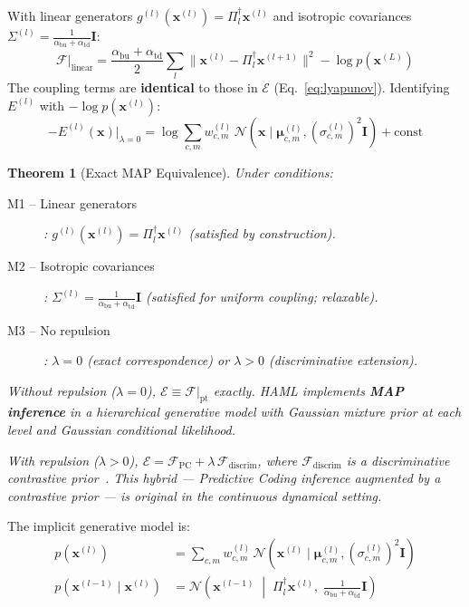 \documentclass[11pt,a4paper]{article}
\newtheorem{theorem}{Theorem}[section]
\begin{document}
With linear generators $g^{(l)}(\mathbf{x}^{(l)}) = \Pi_l^\dagger \mathbf{x}^{(l)}$ and
isotropic covariances $\Sigma^{(l)} = \frac{1}{\alpha_{\mathrm{bu}}+\alpha_{\mathrm{td}}}\mathbf{I}$:
\begin{equation}
  \mathcal{F}\big|_{\mathrm{linear}} =
    \frac{\alpha_{\mathrm{bu}}+\alpha_{\mathrm{td}}}{2}
    \sum_l \|\mathbf{x}^{(l)} - \Pi_l^\dagger \mathbf{x}^{(l+1)}\|^2
    - \log p(\mathbf{x}^{(L)})
\end{equation}
The coupling terms are \textbf{identical} to those in $\mathcal{E}$ (Eq.~\ref{eq:lyapunov}).
Identifying $E^{(l)}$ with $-\log p(\mathbf{x}^{(l)})$:
\begin{equation}
  -E^{(l)}(\mathbf{x})\big|_{\lambda=0} =
    \log \sum_{c,m} w^{(l)}_{c,m}\,
    \mathcal{N}(\mathbf{x} \mid \boldsymbol{\mu}^{(l)}_{c,m}, (\sigma^{(l)}_{c,m})^2\mathbf{I})
    + \text{const}
\end{equation}

\begin{theorem}[Exact MAP Equivalence]
Under conditions:
\begin{description}
  \item[M1 -- Linear generators]: $g^{(l)}(\mathbf{x}^{(l)}) = \Pi_l^\dagger \mathbf{x}^{(l)}$
        (satisfied by construction).
  \item[M2 -- Isotropic covariances]: $\Sigma^{(l)} = \frac{1}{\alpha_{\mathrm{bu}}+\alpha_{\mathrm{td}}}\mathbf{I}$
        (satisfied for uniform coupling; relaxable).
  \item[M3 -- No repulsion]: $\lambda = 0$ (exact correspondence) or $\lambda > 0$ (discriminative extension).
\end{description}
Without repulsion ($\lambda=0$), $\mathcal{E} \equiv \mathcal{F}|_{\mathrm{pt}}$ exactly.
HAML implements \textbf{MAP inference} in a hierarchical generative model with Gaussian mixture
prior at each level and Gaussian conditional likelihood.

With repulsion ($\lambda>0$), $\mathcal{E} = \mathcal{F}_{\mathrm{PC}} + \lambda\,\mathcal{F}_{\mathrm{discrim}}$,
where $\mathcal{F}_{\mathrm{discrim}}$ is a discriminative contrastive prior~\cite{larochelle2008}.
This hybrid --- Predictive Coding inference augmented by a contrastive prior --- is original in
the continuous dynamical setting.
\label{thm:map}
\end{theorem}

The implicit generative model is:
\begin{align}
  p(\mathbf{x}^{(l)}) &=
    \sum_{c,m} w^{(l)}_{c,m}\, \mathcal{N}(\mathbf{x}^{(l)} \mid \boldsymbol{\mu}^{(l)}_{c,m},
    (\sigma^{(l)}_{c,m})^2\mathbf{I}) \\
  p(\mathbf{x}^{(l-1)} \mid \mathbf{x}^{(l)}) &=
    \mathcal{N}\!\left(\mathbf{x}^{(l-1)} \;\middle|\; \Pi_l^\dagger \mathbf{x}^{(l)},\;
    \tfrac{1}{\alpha_{\mathrm{bu}}+\alpha_{\mathrm{td}}}\mathbf{I}\right)
\end{align}
\end{document}
